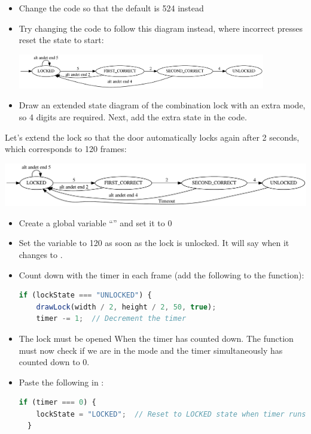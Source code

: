\begin{exercisebox}[adjusted title= Finite state machines - Padlock]
\begin{itemize}
\item Change the code so that the default is 524 instead
\item Try changing the code to follow this diagram instead, where incorrect presses reset the state to start:
 
\includegraphics[width=0.85\textwidth]{graphviz/combinationLock_resetting}

\item Draw an extended state diagram of the combination lock with an extra mode, so 4 digits are required. Next, add the extra state in the code.
\end{itemize}
\end{exercisebox}

\begin{exercisebox}[adjusted title= Automatic relock after 2 seconds]

Let's extend the lock so that the door automatically locks again after 2 seconds,
which corresponds to 120 frames:

\noindent
\begin{center}
\includegraphics[width=1.0\textwidth]{graphviz/combinationLock_timeout}
\end{center}

\begin{itemize}
\item Create a global variable ``'' and set it to 0
\item Set the  variable to 120 as soon as the lock is unlocked. It will
 say when it changes  to .
\item Count down with the timer in each frame (add the following to the  function):

\begin{lstlisting}[language=JavaScript]
if (lockState === "UNLOCKED") {
    drawLock(width / 2, height / 2, 50, true);
    timer -= 1;  // Decrement the timer
\end{lstlisting}

\item The lock must be opened When the timer has counted down. The  function must now check if we are in the mode  and the timer simultaneously has counted down to 0. 
\item Paste the following in :
 
\begin{lstlisting}[language=JavaScript]
if (timer === 0) {
    lockState = "LOCKED";  // Reset to LOCKED state when timer runs out
  }
\end{lstlisting}

\end{itemize}
\end{exercisebox}
